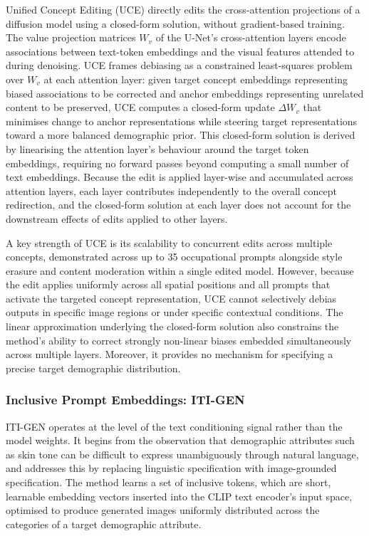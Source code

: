 Unified Concept Editing (UCE) \cite{Gandikota_2024_UCE} directly edits the cross-attention projections of a diffusion model using a closed-form solution, without gradient-based training. The value projection matrices $W_v$ of the U-Net's cross-attention layers encode associations between text-token embeddings and the visual features attended to during denoising. UCE frames debiasing as a constrained least-squares problem over $W_v$ at each attention layer: given target concept embeddings representing biased associations to be corrected and anchor embeddings representing unrelated content to be preserved, UCE computes a closed-form update $\Delta W_v$ that minimises change to anchor representations while steering target representations toward a more balanced demographic prior. This closed-form solution is derived by linearising the attention layer's behaviour around the target token embeddings, requiring no forward passes beyond computing a small number of text embeddings. Because the edit is applied layer-wise and accumulated across attention layers, each layer contributes independently to the overall concept redirection, and the closed-form solution at each layer does not account for the downstream effects of edits applied to other layers.

A key strength of UCE is its scalability to concurrent edits across multiple concepts, demonstrated across up to 35 occupational prompts alongside style erasure and content moderation within a single edited model. However, because the edit applies uniformly across all spatial positions and all prompts that activate the targeted concept representation, UCE cannot selectively debias outputs in specific image regions or under specific contextual conditions. The linear approximation underlying the closed-form solution also constrains the method's ability to correct strongly non-linear biases embedded simultaneously across multiple layers. Moreover, it provides no mechanism for specifying a precise target demographic distribution.

\subsubsection*{Inclusive Prompt Embeddings: ITI-GEN}
\label{subsubsec:iti_gen}

ITI-GEN \cite{Zhang_2023_ITIGEN} operates at the level of the text conditioning signal rather than the model weights. It begins from the observation that demographic attributes such as skin tone can be difficult to express unambiguously through natural language, and addresses this by replacing linguistic specification with image-grounded specification. The method learns a set of inclusive tokens, which are short, learnable embedding vectors inserted into the CLIP text encoder's input space, optimised to produce generated images uniformly distributed across the categories of a target demographic attribute.

